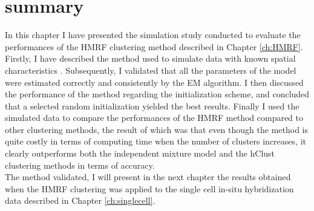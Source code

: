 \section{summary}
In this chapter I have presented the simulation study conducted to evaluate the performances of the HMRF clustering method described in Chapter \ref{ch:HMRF}. Firstly, I have described the method used to simulate data with known spatial characteristics . Subsequently, I validated that all the parameters of the model were estimated correctly and consistently by the EM algorithm. I then discussed the performance of the method regarding the initialization scheme, and concluded that a selected random initialization yielded the best results. Finally I used the simulated data to compare the performances of the HMRF method compared to other clustering methods, the result of which was that even though the method is quite costly in terms of computing time when the number of clusters increases, it clearly outperforms both the independent mixture model and the hClust clustering methods in terms of accuracy.\\

The method validated, I will present in the next chapter the results obtained when the HMRF clustering was applied to the single cell in-situ hybridization data described in Chapter \ref{ch:singlecell}.


